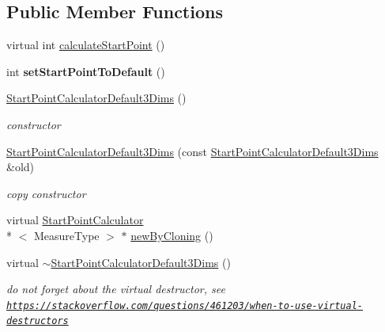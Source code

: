 \subsection*{Public Member Functions}
\begin{DoxyCompactItemize}
\item 
virtual int \hyperlink{class_ox_1_1_start_point_calculator_default3_dims_a6af87ac3412f699ebf9abec6b61461cf}{calculate\-Start\-Point} ()
\item 
\hypertarget{class_ox_1_1_start_point_calculator_default3_dims_a87a616c2a07d07684874cf3ab16cb81a}{int {\bfseries set\-Start\-Point\-To\-Default} ()}\label{class_ox_1_1_start_point_calculator_default3_dims_a87a616c2a07d07684874cf3ab16cb81a}

\item 
\hypertarget{class_ox_1_1_start_point_calculator_default3_dims_ae5c36c3bf882f4770613e5e67821d97b}{\hyperlink{class_ox_1_1_start_point_calculator_default3_dims_ae5c36c3bf882f4770613e5e67821d97b}{Start\-Point\-Calculator\-Default3\-Dims} ()}\label{class_ox_1_1_start_point_calculator_default3_dims_ae5c36c3bf882f4770613e5e67821d97b}

\begin{DoxyCompactList}\small\item\em constructor \end{DoxyCompactList}\item 
\hypertarget{class_ox_1_1_start_point_calculator_default3_dims_a915d5b061b445db983c03d671c65e799}{\hyperlink{class_ox_1_1_start_point_calculator_default3_dims_a915d5b061b445db983c03d671c65e799}{Start\-Point\-Calculator\-Default3\-Dims} (const \hyperlink{class_ox_1_1_start_point_calculator_default3_dims}{Start\-Point\-Calculator\-Default3\-Dims} \&old)}\label{class_ox_1_1_start_point_calculator_default3_dims_a915d5b061b445db983c03d671c65e799}

\begin{DoxyCompactList}\small\item\em copy constructor \end{DoxyCompactList}\item 
virtual \hyperlink{class_ox_1_1_start_point_calculator}{Start\-Point\-Calculator}\\*
$<$ Measure\-Type $>$ $\ast$ \hyperlink{class_ox_1_1_start_point_calculator_default3_dims_ad2d60ec81810eb5b0368834e15d031bd}{new\-By\-Cloning} ()
\item 
\hypertarget{class_ox_1_1_start_point_calculator_default3_dims_ab85b597c934ed1ac03ff7079bd860b44}{virtual \hyperlink{class_ox_1_1_start_point_calculator_default3_dims_ab85b597c934ed1ac03ff7079bd860b44}{$\sim$\-Start\-Point\-Calculator\-Default3\-Dims} ()}\label{class_ox_1_1_start_point_calculator_default3_dims_ab85b597c934ed1ac03ff7079bd860b44}

\begin{DoxyCompactList}\small\item\em do not forget about the virtual destructor, see \href{https://stackoverflow.com/questions/461203/when-to-use-virtual-destructors}{\tt https\-://stackoverflow.\-com/questions/461203/when-\/to-\/use-\/virtual-\/destructors} \end{DoxyCompactList}\end{DoxyCompactItemize}
